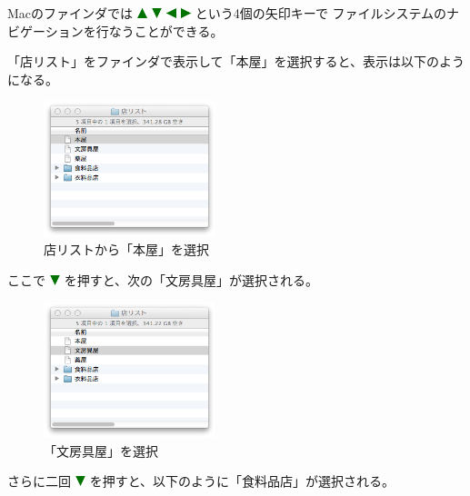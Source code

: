 \documentclass[twoside]{wiss}
\def\figwidth{50mm}
\def\up{ \includegraphics[width=3mm,bb=0 0 36 36]{figures/uptriangle.pdf} }
\def\down{ \includegraphics[width=3mm,bb=0 0 36 36]{figures/downtriangle.pdf} }
\def\right{ \includegraphics[width=3mm,bb=0 0 36 36]{figures/righttriangle.pdf} }
\def\left{ \includegraphics[width=3mm,bb=0 0 36 36]{figures/lefttriangle.pdf} }
\begin{document}
Macのファインダでは
{\up}{\down}{\left}{\right}という4個の矢印キーで
ファイルシステムのナビゲーションを行なうことができる。

「店リスト」をファインダで表示して「本屋」を選択すると、表示は以下のようになる。

\begin{figure}[H]
\centerline{\includegraphics[width=\figwidth,bb=0 0 344 272]{figures/9b121bec45e5b480e5ac64fdd0f82592.png}}
\caption{店リストから「本屋」を選択}
\label{screenshot2}
\end{figure}

\noindent
ここで{\down}を押すと、次の「文房具屋」が選択される。

\begin{figure}[H]
\centerline{\includegraphics[width=\figwidth,bb=0 0 344 272]{figures/f43016d1b524baf414f2c32c48fe9588.png}}
\caption{「文房具屋」を選択}
\label{screenshot3}
\end{figure}

\noindent
さらに二回{\down}を押すと、以下のように「食料品店」が選択される。
\end{document}
